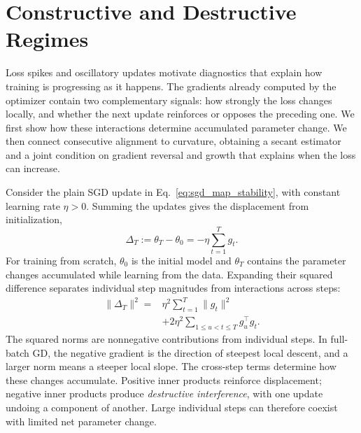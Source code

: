 \section{Constructive and Destructive Regimes}
\label{sec:displacement}

Loss spikes and oscillatory updates motivate diagnostics that explain how
training is progressing as it happens. The gradients already computed by
the optimizer contain two complementary signals: how strongly the loss
changes locally, and whether the next update reinforces or opposes the
preceding one. We first show how these interactions determine accumulated
parameter change. We then connect consecutive alignment to curvature,
obtaining a secant estimator and a joint condition on gradient
reversal and growth that explains when the loss can increase.

Consider the plain SGD update in Eq.~\eqref{eq:sgd_map_stability}, with
constant learning rate $\eta>0$. Summing the updates gives the displacement
from initialization,
\begin{equation}
  \Delta_T:=\theta_T-\theta_0=-\eta\sum_{t=1}^T g_t.
  \label{eq:displacement}
\end{equation}
For training from scratch, $\theta_0$ is the initial model and $\theta_T$
contains the parameter changes accumulated while learning from the data.
Expanding their squared difference separates individual step magnitudes
from interactions across steps:
\begin{equation}
\begin{aligned}
  \|\Delta_T\|^2
  ={}&\eta^2\sum_{t=1}^T\|g_t\|^2\\
     &+2\eta^2\sum_{1\leq u<t\leq T}g_u^\top g_t.
\end{aligned}
\label{eq:magnitude-interaction}
\end{equation}
The squared norms are nonnegative contributions from individual steps.
In full-batch GD, the negative gradient is the direction of steepest
local descent, and a larger norm means a steeper local slope. The
cross-step terms determine how these changes accumulate. Positive inner
products reinforce displacement; negative inner products produce
\emph{destructive interference}, with one update undoing a component
of another. Large individual steps can therefore coexist with limited
net parameter change.

